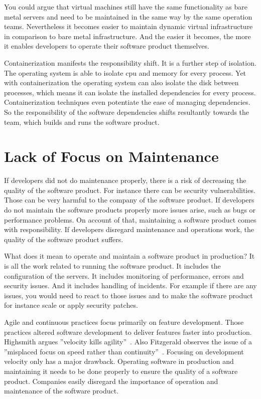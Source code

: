 You could argue that virtual machines still have the same functionality as bare metal
servers and need to be maintained in the same way by the same operation
teams. Nevertheless it becomes easier to maintain dynamic virtual
infrastructure~\cite{infra_as_code_platforms} in comparison to bare metal
infrastructure. And the easier it becomes, the more it enables developers to operate their
software product themselves.

Containerization manifests the responsibility shift. It is a further step of
isolation. The operating system is able to isolate cpu and memory for every process. Yet
with containerization the operating system can also isolate the disk between processes,
which means it can isolate the installed dependencies for every process. Containerization
techniques even potentiate the ease of managing dependencies. So the responsibility of the
software dependencies shifts resultantly towards the team, which builds and runs the
software product.


\section{Lack of Focus on Maintenance}

If developers did not do maintenance properly, there is a risk of decreasing the quality
of the software product. For instance there can be security vulnerabilities. Those can be
very harmful to the company of the software product. If developers do not maintain the
software products properly more issues arise, such as bugs or performance problems. On
account of that, maintaining a software product comes with responsibility. If developers
disregard maintenance and operations work, the quality of the software product suffers.

What does it mean to operate and maintain a software product in production? It is all the
work related to running the software product. It includes the configuration of the
servers. It includes monitoring of performance, errors and security issues. And it
includes handling of incidents. For example if there are any issues, you would need to
react to those issues and to make the software product for instance scale or apply
security patches.

Agile and continuous practices focus primarily on feature development. Those practices
altered software development to deliver features faster into production. Highsmith argues
”velocity kills agility”~\cite{velocity_kills}. Also Fitzgerald observes the issue of a
”misplaced focus on speed rather than continuity”~\cite{continuous_fitzgerald}. Focusing
on development velocity only has a major drawback. Operating software in production and
maintaining it needs to be done properly to ensure the quality of a software
product. Companies easily disregard the importance of operation and maintenance of the
software product.


